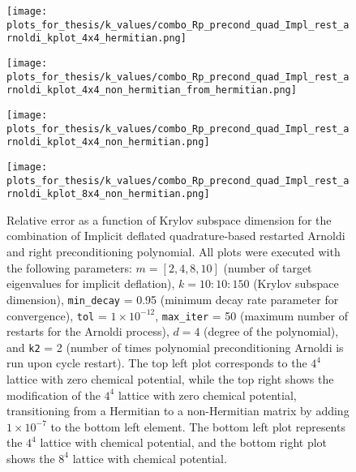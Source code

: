 \begin{figure}[H]
    \centering
    \begin{minipage}{0.45\textwidth}
        \centering
        \texttt{[image: plots\_for\_thesis/k\_values/combo\_Rp\_precond\_quad\_Impl\_rest\_arnoldi\_kplot\_4x4\_hermitian.png]} %
    \end{minipage}%
    \hspace{0.02\textwidth} %
    \begin{minipage}{0.45\textwidth}
        \centering
        \texttt{[image: plots\_for\_thesis/k\_values/combo\_Rp\_precond\_quad\_Impl\_rest\_arnoldi\_kplot\_4x4\_non\_hermitian\_from\_hermitian.png]} %
    \end{minipage}
    
    \vspace{0.02\textwidth} %
    
    \begin{minipage}{0.45\textwidth}
        \centering
        \texttt{[image: plots\_for\_thesis/k\_values/combo\_Rp\_precond\_quad\_Impl\_rest\_arnoldi\_kplot\_4x4\_non\_hermitian.png]} %
    \end{minipage}%
    \hspace{0.02\textwidth} %
    \begin{minipage}{0.45\textwidth}
        \centering
        \texttt{[image: plots\_for\_thesis/k\_values/combo\_Rp\_precond\_quad\_Impl\_rest\_arnoldi\_kplot\_8x4\_non\_hermitian.png]} %
    \end{minipage}
    
    \caption{\small Relative error as a function of Krylov subspace dimension for the combination of Implicit deflated quadrature-based restarted Arnoldi and right preconditioning polynomial. All plots were executed with the following parameters: $m = [2, 4, 8, 10]$ (number of target eigenvalues for implicit deflation), $k = 10:10:150$ (Krylov subspace dimension), \texttt{min\_decay} = 0.95 (minimum decay rate parameter for convergence), \texttt{tol} = $1 \times 10^{-12}$, \texttt{max\_iter} = 50 (maximum number of restarts for the Arnoldi process), $d = 4$ (degree of the polynomial), and \texttt{k2} = 2 (number of times polynomial preconditioning Arnoldi is run upon cycle restart). The top left plot corresponds to the $4^4$ lattice with zero chemical potential, while the top right shows the modification of the $4^4$ lattice with zero chemical potential, transitioning from a Hermitian to a non-Hermitian matrix by adding $1 \times 10^{-7}$ to the bottom left element. The bottom left plot represents the $4^4$ lattice with chemical potential, and the bottom right plot shows the $8^4$ lattice with chemical potential.}
    \label{fig:combo_imp_rest_arnoldi+right_precond_k_plot}
\end{figure}

